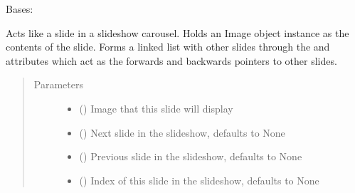\documentclass[letterpaper,10pt,english]{sphinxmanual}
\begin{document}
\begin{fulllineitems}
\label{\detokenize{polo.widgets:polo.widgets.slideshow_viewer.Slide}}
Bases: 

Acts like a slide in a slideshow carousel. Holds an Image object instance
as the contents of the slide. Forms a linked list with other slides through
the  and  attributes which act as the forwards
and backwards pointers to other slides.
\begin{quote}\begin{description}
\item[{Parameters}] \leavevmode\begin{itemize}
\item {} 
 ({\hyperref[\detokenize{polo.crystallography:polo.crystallography.image.Image}]{}}) \textendash{} Image that this slide will display

\item {} 
 ({\hyperref[\detokenize{polo.widgets:polo.widgets.slideshow_viewer.Slide}]{}}\sphinxstyleliteralemphasis{\sphinxupquote{, }}) \textendash{} Next slide in the slideshow, defaults to None

\item {} 
 ({\hyperref[\detokenize{polo.widgets:polo.widgets.slideshow_viewer.Slide}]{}}\sphinxstyleliteralemphasis{\sphinxupquote{, }}) \textendash{} Previous slide in the slideshow, defaults to None

\item {} 
 (\sphinxstyleliteralemphasis{\sphinxupquote{, }}) \textendash{} Index of this slide in the slideshow, defaults to None

\end{itemize}

\end{description}\end{quote}

\end{fulllineitems}
\end{document}

